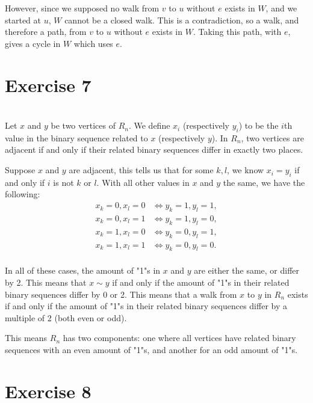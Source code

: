 \documentclass[12pt]{article}
\begin{document}
However, since we supposed no walk from $v$ to $u$ without $e$ exists in $W$, and we started at $u$, $W$ cannot be a closed walk. This is a contradiction, so a walk, and therefore a path, from $v$ to $u$ without $e$ exists in $W$. Taking this path, with $e$, gives a cycle in $W$ which uses $e$.


\newpage
\section*{Exercise 7}
\\

Let $x$ and $y$ be two vertices of $R_n$. We define $x_i$ (respectively $y_i$) to be the $i$th value in the binary sequence related to $x$ (respectively $y$). In $R_n$, two vertices are adjacent if and only if their related binary sequences differ in exactly two places.

Suppose $x$ and $y$ are adjacent, this tells us that for some $k,l$, we know $x_i=y_i$ if and only if $i$ is not $k$ or $l$. With all other values in $x$ and $y$ the same, we have the following:
\begin{align*}
    x_k = 0, x_l = 0 &\iff y_k=1, y_l=1, \\
    x_k = 0, x_l = 1 &\iff y_k=1, y_l=0, \\
    x_k = 1, x_l = 0 &\iff y_k=0, y_l=1, \\
    x_k = 1, x_l = 1 &\iff y_k=0, y_l=0. \\
\end{align*}

In all of these cases, the amount of "1"s in $x$ and $y$ are either the same, or differ by 2. This means that $x\sim y$ if and only if the amount of "1"s in their related binary sequences differ by 0 or 2. This means that a walk from $x$ to $y$ in $R_n$ exists if and only if the amount of "1"s in their related binary sequences differ by a multiple of 2 (both even or odd).

This means $R_n$ has two components: one where all vertices have related binary sequences with an even amount of "1"s, and another for an odd amount of "1"s.


\section*{Exercise 8}
\\
\end{document}
